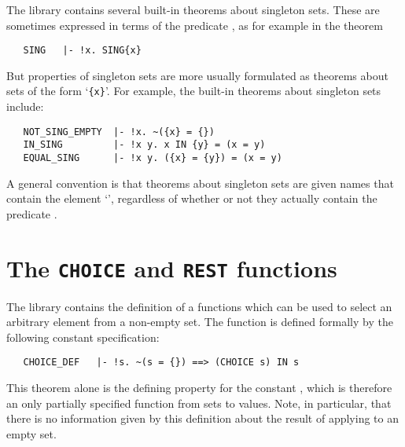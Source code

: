 \noindent The library contains several built-in theorems about singleton sets.
These are sometimes expressed in terms of the predicate , as for
example in the theorem

\begin{hol}
\begin{verbatim}
   SING   |- !x. SING{x}
\end{verbatim}\end{hol}

\noindent But properties of singleton sets are more usually formulated as
theorems about sets of the form `{\small\verb"{x}"}'. For example, the built-in
theorems about singleton sets include:

\begin{hol}
\begin{verbatim}
   NOT_SING_EMPTY  |- !x. ~({x} = {})
   IN_SING         |- !x y. x IN {y} = (x = y)
   EQUAL_SING      |- !x y. ({x} = {y}) = (x = y)
\end{verbatim}\end{hol}

\noindent A general
convention is that theorems about singleton sets are given names that contain
the element `', regardless of whether or not they actually contain the
predicate .

\section{The {\tt CHOICE} and {\tt REST} functions}

The  library contains the definition of a functions  which
can be used to select an arbitrary element from a non-empty set. The function
 is defined formally by the following constant specification:

\begin{hol}
\begin{verbatim}
   CHOICE_DEF   |- !s. ~(s = {}) ==> (CHOICE s) IN s
\end{verbatim}\end{hol}

\noindent This theorem alone is the defining property for the constant
, which is therefore an only partially specified function from sets
to values.  Note, in particular, that there is no information given by this
definition about the result of applying  to an empty set.

